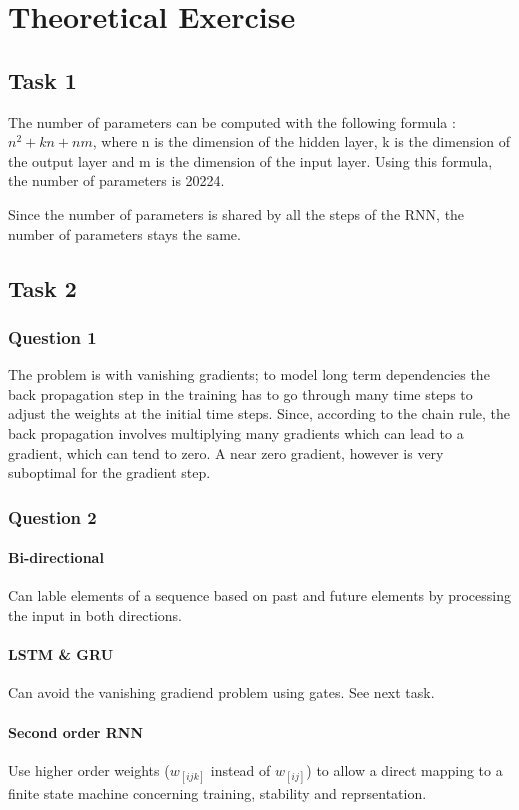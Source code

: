 \documentclass[10pt]{article}
\begin{document}
\section{Theoretical Exercise}
\subsection{Task 1}
The number of parameters can be computed with the following formula : 
$n^2+kn+nm$, where n is the dimension of the hidden layer, k is the dimension of the output layer and m is the dimension of the input layer. Using this formula, the number of parameters is 20224. 

Since the number of parameters is shared by all the steps of the RNN, the number of parameters stays the same.

\subsection{Task 2}
\subsubsection{Question 1}
The problem is with vanishing gradients; to model long term dependencies the back propagation step in the training has to go through many time steps to adjust the weights at the initial time steps. Since, according to the chain rule, the back propagation involves multiplying many gradients which can lead to a gradient, which can tend to zero. A near zero gradient, however is very suboptimal for the gradient step. 
\subsubsection{Question 2}
\paragraph{Bi-directional} Can lable elements of a sequence based on past and future elements by processing the input in both directions.

\paragraph{LSTM \& GRU} Can avoid the vanishing gradiend problem using gates. See next task.

\paragraph{Second order RNN} Use higher order weights ($w_[ijk]$ instead of $w_[ij]$) to allow a direct mapping to a finite state machine concerning training, stability and reprsentation.
\end{document}
